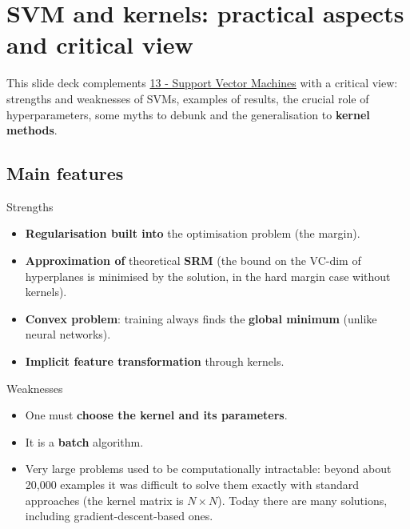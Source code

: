 \chapter{SVM and kernels: practical aspects and critical view}\label{ch-14}

This slide deck complements
\href{13\%20-\%20Support\%20Vector\%20Machines}{13 - Support Vector
Machines} with a critical view: strengths and weaknesses of SVMs,
examples of results, the crucial role of hyperparameters, some myths to
debunk and the generalisation to \textbf{kernel methods}.

\section{Main features}\label{caratteristiche-principali}

\begin{boxabstract}{Strengths}

\begin{itemize}
\tightlist
\item
  \textbf{Regularisation built into} the optimisation problem (the
  margin).
\item
  \textbf{Approximation of} theoretical \textbf{SRM} (the bound on the
  VC-dim of hyperplanes is minimised by the solution, in the hard
  margin case without kernels).
\item
  \textbf{Convex problem}: training always finds the \textbf{global
  minimum} (unlike neural networks).
\item
  \textbf{Implicit feature transformation} through kernels.
\end{itemize}

\end{boxabstract}

\begin{boxwarning}{Weaknesses}

\begin{itemize}
\tightlist
\item
  One must \textbf{choose the kernel and its parameters}.
\item
  It is a \textbf{batch} algorithm.
\item
  Very large problems used to be computationally intractable: beyond
  about 20,000 examples it was difficult to solve them exactly with
  standard approaches (the kernel matrix is \(N \times N\)). Today there
  are many solutions, including gradient-descent-based ones.
\end{itemize}

\end{boxwarning}

